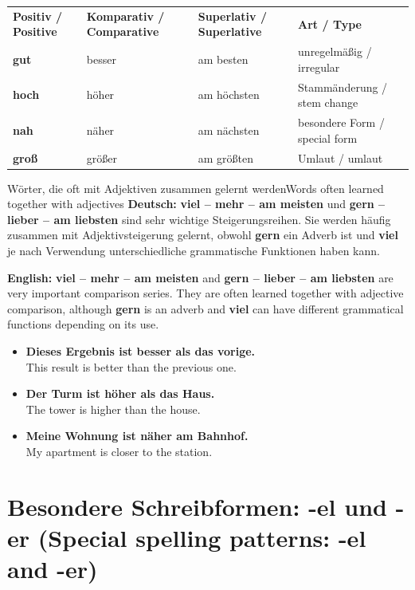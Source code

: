 \documentclass[a4paper,11pt]{article}
\newcommand{\GermanText}[1]{\textbf{Deutsch: }#1\par}
\newcommand{\EnglishText}[1]{{\small\color{SoftGray}\textbf{English: }#1\par}}
\newcommand{\ExampleItem}[2]{\item \textbf{#1}\\{\small\color{SoftGray}#2}}
\begin{document}
      \begin{longtable}{>{\bfseries}p{3.2cm}|p{3.6cm}|p{3.8cm}|p{3.2cm}}
         \rowcolor{HeaderBlueDark}
         \color{white}\textbf{Positiv / Positive} &
         \color{white}\textbf{Komparativ / Comparative} &
         \color{white}\textbf{Superlativ / Superlative} &
         \color{white}\textbf{Art / Type} \\
         gut & besser & am besten & unregelmäßig / irregular \\
         hoch & höher & am höchsten & Stammänderung / stem change \\
         nah & näher & am nächsten & besondere Form / special form \\
         groß & größer & am größten & Umlaut / umlaut \\
      \end{longtable}

      \begin{grammarentry}{Wörter, die oft mit Adjektiven zusammen gelernt werden}{Words often learned together with adjectives}
         \GermanText{\textbf{viel -- mehr -- am meisten} und \textbf{gern -- lieber -- am liebsten} sind sehr wichtige Steigerungsreihen. Sie werden häufig zusammen mit Adjektivsteigerung gelernt, obwohl \textbf{gern} ein Adverb ist und \textbf{viel} je nach Verwendung unterschiedliche grammatische Funktionen haben kann.}
         \EnglishText{\textbf{viel -- mehr -- am meisten} and \textbf{gern -- lieber -- am liebsten} are very important comparison series. They are often learned together with adjective comparison, although \textbf{gern} is an adverb and \textbf{viel} can have different grammatical functions depending on its use.}
      \end{grammarentry}

      \begin{exbox}
         \begin{itemize}
            \ExampleItem{Dieses Ergebnis ist besser als das vorige.}{This result is better than the previous one.}
            \ExampleItem{Der Turm ist höher als das Haus.}{The tower is higher than the house.}
            \ExampleItem{Meine Wohnung ist näher am Bahnhof.}{My apartment is closer to the station.}
         \end{itemize}
      \end{exbox}

   \section{Besondere Schreibformen: -el und -er \textnormal{(Special spelling patterns: -el and -er)}}
\end{document}
